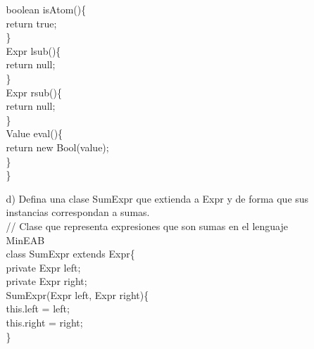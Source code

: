 \documentclass{article}
\begin{document}
\begin{itemize}
\begin{itemize}
            \hspace*{0.6cm}boolean isAtom()\{\\
            \hspace*{1.37cm}return true;\\
            \hspace*{0.6cm}\}\\
            
            \hspace*{0.6cm}Expr lsub()\{\\
            \hspace*{1.37cm}return null;\\
            \hspace*{0.6cm}\}\\
            
            \hspace*{0.6cm}Expr rsub()\{\\
            \hspace*{1.37cm}return null;\\
            \hspace*{0.6cm}\}\\
            
            \hspace*{0.6cm}Value eval()\{\\
            \hspace*{1.37cm}return new Bool(value);\\
            \hspace*{0.6cm}\}\\
            \}\\
            
            \item[d)] Defina una clase SumExpr que extienda a Expr y de forma que sus instancias correspondan a sumas.\\

            // Clase que representa expresiones que son sumas en el lenguaje MinEAB\\
            class SumExpr extends Expr\{\\
            \hspace*{0.6cm}private Expr left;\\
            \hspace*{0.6cm}private Expr right;\\
            
            \hspace*{0.6cm}SumExpr(Expr left, Expr right)\{\\
            \hspace*{1.37cm}this.left = left;\\
            \hspace*{1.37cm}this.right = right;\\
            \hspace*{0.65cm}\}\\
            

\end{itemize}
\end{itemize}
\end{document}
